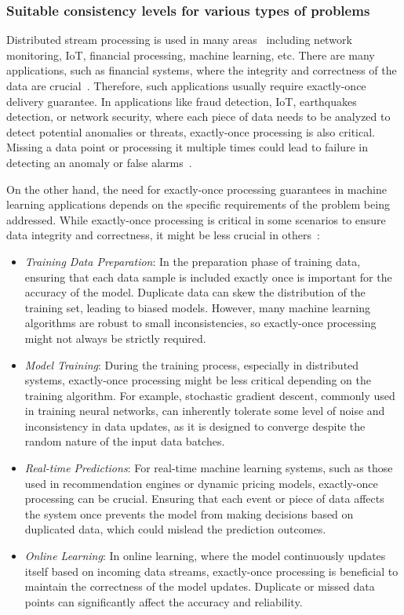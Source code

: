 \subsubsection{Suitable consistency levels for various types of problems}

Distributed stream processing is used in many areas~\cite{fragkoulis2024survey} including network monitoring, IoT, financial processing, machine learning, etc. There are many applications, such as financial systems, where the integrity and correctness of the data are crucial~\cite{zhang2024survey}. Therefore, such applications usually require exactly-once delivery guarantee. In applications like fraud detection, IoT, earthquakes detection, or network security, where each piece of data needs to be analyzed to detect potential anomalies or threats, exactly-once processing is also critical. Missing a data point or processing it multiple times could lead to failure in detecting an anomaly or false alarms~\cite{zhou2019scalable, diro2024anomaly, 10.1093/gji/ggac355, geldenhuys2021dependable}.

On the other hand, the need for exactly-once processing guarantees in machine learning applications depends on the specific requirements of the problem being addressed. While exactly-once processing is critical in some scenarios to ensure data integrity and correctness, it might be less crucial in others~\cite{boden2017distributed, webirte}:
\begin{itemize}
    \item {\em Training Data Preparation}: In the preparation phase of training data, ensuring that each data sample is included exactly once is important for the accuracy of the model. Duplicate data can skew the distribution of the training set, leading to biased models. However, many machine learning algorithms are robust to small inconsistencies, so exactly-once processing might not always be strictly required.
    \item {\em Model Training}: During the training process, especially in distributed systems, exactly-once processing might be less critical depending on the training algorithm. For example, stochastic gradient descent, commonly used in training neural networks, can inherently tolerate some level of noise and inconsistency in data updates, as it is designed to converge despite the random nature of the input data batches.
    \item {\em Real-time Predictions}: For real-time machine learning systems, such as those used in recommendation engines or dynamic pricing models, exactly-once processing can be crucial. Ensuring that each event or piece of data affects the system once prevents the model from making decisions based on duplicated data, which could mislead the prediction outcomes.
    \item {\em Online Learning}: In online learning, where the model continuously updates itself based on incoming data streams, exactly-once processing is beneficial to maintain the correctness of the model updates. Duplicate or missed data points can significantly affect the accuracy and reliability.
\end{itemize}

